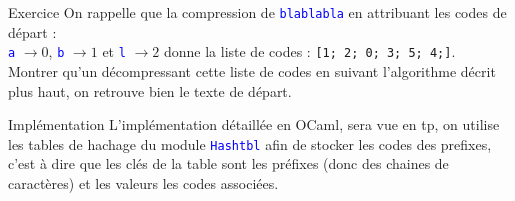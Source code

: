 \documentclass[10pt]{beamer}
\begin{document}
\begin{frame}{\Ctitle}{\stitle}
	\begin{exampleblock}{Exercice}
		On rappelle que la compression de \textcolor{blue}{\tt blablabla} en attribuant les codes de départ :\\ \textcolor{blue}{\tt a} $\rightarrow 0$, \textcolor{blue}{\tt b} $\rightarrow 1$ et \textcolor{blue}{\tt l} $\rightarrow 2$ donne la liste de codes : {\tt [1; 2; 0; 3; 5; 4;]}. \\
		Montrer qu'un décompressant cette liste de codes en suivant l'algorithme décrit plus haut, on retrouve bien le texte de départ.
	\end{exampleblock}
\end{frame}

\begin{frame}{\Ctitle}{\stitle}
	\begin{block}{Implémentation}
		L'implémentation détaillée en OCaml, sera vue en {\sc tp}, on utilise les tables de hachage du module \textcolor{blue}{\tt Hashtbl} afin de stocker les codes des prefixes, c'est à dire que les clés de la table sont les préfixes (donc des chaines de caractères) et les valeurs les codes associées.
	\end{block}
\end{frame}
\end{document}

